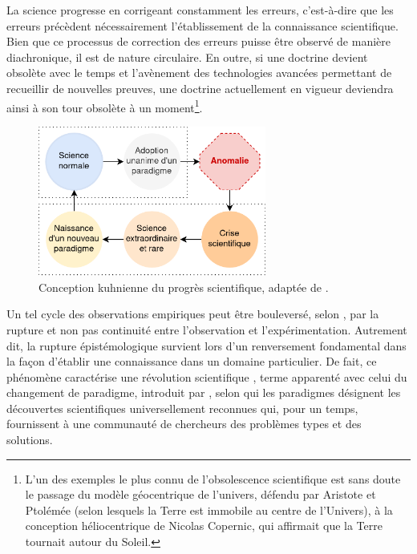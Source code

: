 La science progresse en corrigeant constamment les erreurs, c'est-à-dire que les erreurs précèdent nécessairement l'établissement de la connaissance scientifique. Bien que ce processus de correction des erreurs puisse être observé de manière diachronique, il est de nature circulaire. En outre, si une doctrine devient obsolète avec le temps et l'avènement des technologies avancées permettant de recueillir de nouvelles preuves, une doctrine actuellement en vigueur deviendra ainsi à son tour obsolète à un moment\footnote{L'un des exemples le plus connu de l'obsolescence scientifique est sans doute le passage du modèle géocentrique de l'univers, défendu par Aristote et Ptolémée (selon lesquels la Terre est immobile au centre de l'Univers), à la conception héliocentrique de Nicolas Copernic, qui affirmait que la Terre tournait autour du Soleil.}.
\begin{figure}[h!]
    \centering
    \includegraphics[width=75mm,scale=0.5]{img/doxa_episteme.png}
    \caption{Conception kuhnienne du progrès scientifique, adaptée de \citet{amiri2012}.}
    \label{fig:enter-label}
\end{figure}

Un tel cycle des observations empiriques peut être bouleversé, selon \citet{bachelard1934formation}, par la \og{}rupture et non pas continuité entre l'observation et l'expérimentation\fg{}. Autrement dit, la rupture épistémologique survient lors d’un renversement fondamental dans la façon d’établir une connaissance dans un domaine particulier. De fait, ce phénomène caractérise une \og{}révolution scientifique\fg{} \cite{koyre1962monde}, terme apparenté avec celui du \og{}changement de paradigme\fg{}, introduit par \citet{kuhn1962structure}, selon qui les paradigmes désignent les \og{}découvertes scientifiques universellement reconnues qui, pour un temps, fournissent à une communauté de chercheurs des problèmes types et des solutions\fg{}. 

